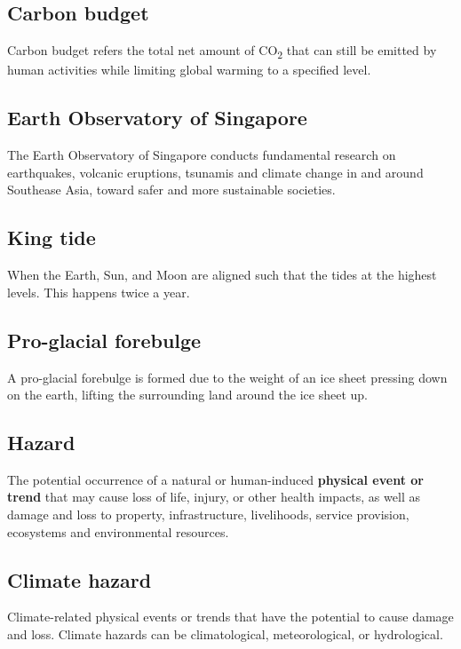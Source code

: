 \documentclass[11pt]{article}
\begin{document}
\subsection{Carbon budget}
\label{sec:orgd0074e9}
Carbon budget refers the total net amount of CO\textsubscript{2} that can still be emitted by human activities while limiting global warming to a specified level.

\subsection{Earth Observatory of Singapore}
\label{sec:orgd5d58dc}
The Earth Observatory of Singapore conducts fundamental research on earthquakes, volcanic eruptions, tsunamis and climate change in and around Southease Asia, toward safer and more sustainable societies.

\subsection{King tide}
\label{sec:org11006b6}
When the Earth, Sun, and Moon are aligned such that the tides at the highest levels. This happens twice a year.

\subsection{Pro-glacial forebulge}
\label{sec:org6eab42f}
A pro-glacial forebulge is formed due to the weight of an ice sheet pressing down on the earth, lifting the surrounding land around the ice sheet up.

\subsection{Hazard}
\label{sec:org9cec401}
The potential occurrence of a natural or human-induced \textbf{physical event or trend} that may cause loss of life, injury, or other health impacts, as well as damage and loss to property, infrastructure, livelihoods, service provision, ecosystems and environmental resources.

\newpage

\subsection{Climate hazard}
\label{sec:orgaa7825e}
Climate-related physical events or trends that have the potential to cause damage and loss. Climate hazards can be climatological, meteorological, or hydrological.
\end{document}

